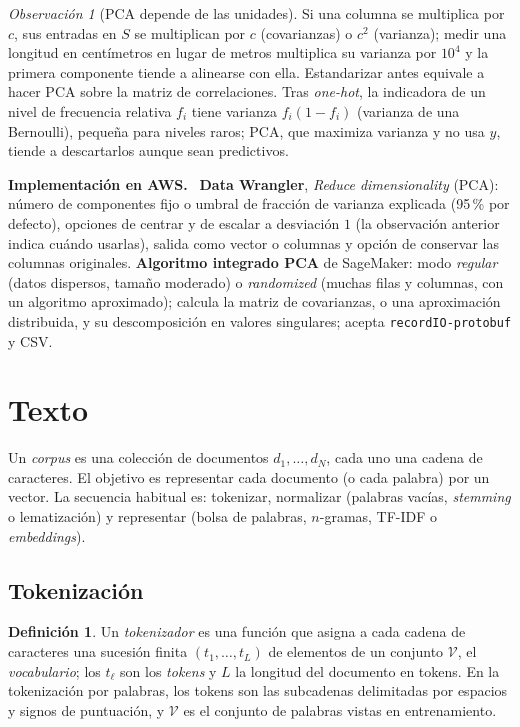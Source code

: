 \documentclass[11pt,a4paper]{article}
\theoremstyle{plain}
\theoremstyle{definition}
\newtheorem{definicion}[teorema]{Definición}
\theoremstyle{remark}
\newtheorem{observacion}[teorema]{Observación}
\newcommand{\1}{\mathbf{1}}
\newenvironment{aws}{\par\medskip\sloppy\noindent\textbf{Implementación en AWS.}\ }{\par\medskip}
\begin{document}
\begin{observacion}[PCA depende de las unidades]
Si una columna se multiplica por $c$, sus entradas en $S$ se multiplican
por $c$ (covarianzas) o $c^2$ (varianza); medir una longitud en centímetros
en lugar de metros multiplica su varianza por $10^4$ y la primera
componente tiende a alinearse con ella. Estandarizar antes equivale a
hacer PCA sobre la matriz de correlaciones. Tras \emph{one-hot}, la
indicadora de un nivel de frecuencia relativa $f_i$ tiene varianza
$f_i(1-f_i)$ (varianza de una Bernoulli), pequeña para niveles raros; PCA,
que maximiza varianza y no usa $y$, tiende a descartarlos aunque sean
predictivos.
\end{observacion}

\begin{aws}
\textbf{Data Wrangler}, \emph{Reduce dimensionality} (PCA): número de
componentes fijo o umbral de fracción de varianza explicada (95\,\% por
defecto), opciones de centrar y de escalar a desviación $1$ (la
observación anterior indica cuándo usarlas), salida como vector o columnas
y opción de conservar las columnas originales. \textbf{Algoritmo
integrado PCA} de SageMaker: modo \emph{regular} (datos dispersos, tamaño
moderado) o \emph{randomized} (muchas filas y columnas, con un algoritmo
aproximado); calcula la matriz de covarianzas, o una aproximación
distribuida, y su descomposición en valores singulares; acepta
\texttt{recordIO-protobuf} y CSV.
\end{aws}

\section{Texto}\label{sec:texto}

Un \emph{corpus} es una colección de documentos $d_1,\dots,d_N$, cada uno
una cadena de caracteres. El objetivo es representar cada documento (o
cada palabra) por un vector. La secuencia habitual es: tokenizar,
normalizar (palabras vacías, \emph{stemming} o lematización) y representar
(bolsa de palabras, $n$-gramas, TF-IDF o \emph{embeddings}).

\subsection{Tokenización}

\begin{definicion}
Un \emph{tokenizador} es una función que asigna a cada cadena de
caracteres una sucesión finita $(t_1,\dots,t_L)$ de elementos de un
conjunto $\mathcal V$, el \emph{vocabulario}; los $t_\ell$ son los
\emph{tokens} y $L$ la longitud del documento en tokens. En la
tokenización por palabras, los tokens son las subcadenas delimitadas por
espacios y signos de puntuación, y $\mathcal V$ es el conjunto de palabras
vistas en entrenamiento.
\end{definicion}
\end{document}
